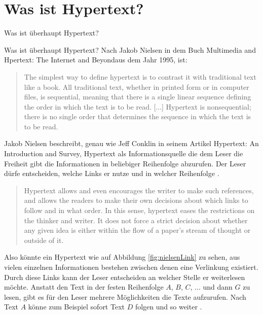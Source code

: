 \chapter{Was ist Hypertext?}
\label{ch:Was ist Hypertext?}

\begin{section}{Was ist überhaupt Hypertext?}
\label{sec:big_brother}

Was ist überhaupt Hypertext? Nach Jakob Nielsen in dem Buch \glqq Multimedia and Hpertext: The Internet and Beyond\grqq{ }aus dem Jahr 1995, ist:

\begin{quote}
\glqq The simplest way to define hypertext is to contrast it with traditional text like a book. All traditional text, whether in printed form or in computer files, is sequential, meaning that there is a single linear sequence defining the order in which the text is to be read. [...] Hypertext is nonsequential; there is no single order that determines the sequence in which the text is to be read.\grqq{ }\cite[S.1]{Nielsen1995}
\end{quote}

Jakob Nielsen beschreibt, genau wie Jeff Conklin in seinem Artikel \glqq Hypertext: An Introduction and Survey\grqq, Hypertext als Informationsquelle die dem Leser die Freiheit gibt die Informationen in beliebiger Reihenfolge abzurufen. Der Leser dürfe entscheiden, welche Links er nutze und in welcher Reihenfolge \cite[S.33]{Conklin1987} \cite[S.1]{Nielsen1995}.

\begin{quote}
\glqq Hypertext allows and even encourages the writer to make such references, and allows the readers to make their own decisions about which links to follow and in what order. In this sense, hypertext eases the restrictions on the thinker and writer. It does not force a strict decision about whether any given idea is either within the flow of a paper's stream of thought or outside of it.\grqq{ }\cite[S.33]{Conklin1987}
\end{quote}

Also könnte ein Hypertext wie auf Abbildung \ref{fig:nielsenLink} zu sehen, aus vielen einzelnen Informationen bestehen zwischen denen eine Verlinkung existiert. Durch diese Links kann der Leser entscheiden an welcher Stelle er weiterlesen möchte. Anstatt den Text in der festen Reihenfolge $A$, $B$, $C$, $...$ und dann $G$ zu lesen, gibt es für den Leser mehrere Möglichkeiten die Texte aufzurufen. Nach Text $A$ könne zum Beispiel sofort Text $D$ folgen und so weiter \cite[S.1]{Nielsen1995}.


\end{section}

